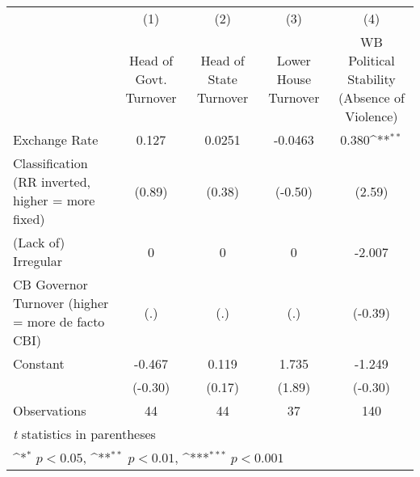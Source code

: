{
\def\sym#1{\ifmmode^{#1}\else\(^{#1}\)\fi}
\begin{tabular}{l*{4}{c}}
\hline\hline
                    &\multicolumn{1}{c}{(1)}&\multicolumn{1}{c}{(2)}&\multicolumn{1}{c}{(3)}&\multicolumn{1}{c}{(4)}\\
                    &\multicolumn{1}{c}{Head of Govt. Turnover}&\multicolumn{1}{c}{Head of State Turnover}&\multicolumn{1}{c}{Lower House Turnover}&\multicolumn{1}{c}{WB Political Stability (Absence of Violence)}\\
\hline
Exchange Rate       &       0.127         &      0.0251         &     -0.0463         &       0.380\sym{**} \\
Classification (RR inverted, higher = more fixed)&      (0.89)         &      (0.38)         &     (-0.50)         &      (2.59)         \\
[1em]
(Lack of) Irregular &           0         &           0         &           0         &      -2.007         \\
CB Governor Turnover (higher = more de facto CBI)&         (.)         &         (.)         &         (.)         &     (-0.39)         \\
[1em]
Constant            &      -0.467         &       0.119         &       1.735         &      -1.249         \\
                    &     (-0.30)         &      (0.17)         &      (1.89)         &     (-0.30)         \\
\hline
Observations        &          44         &          44         &          37         &         140         \\
\hline\hline
\multicolumn{5}{l}{\footnotesize \textit{t} statistics in parentheses}\\
\multicolumn{5}{l}{\footnotesize \sym{*} \(p<0.05\), \sym{**} \(p<0.01\), \sym{***} \(p<0.001\)}\\
\end{tabular}
}
